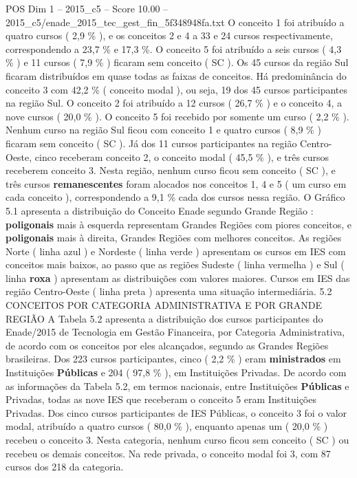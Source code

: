 \begin{textsample}{POS Dim 1 – 2015\_c5 – Score 10.00 – 2015\_c5/enade\_2015\_tec\_gest\_fin\_5f348948fa.txt}
O conceito 1 foi atribuído a quatro cursos ( 2,9 \% ), e os conceitos 2 e 4 a 33 e 24 cursos respectivamente, correspondendo a 23,7 \% e 17,3 \%.
O conceito 5 foi atribuído a seis cursos ( 4,3 \% ) e 11 cursos ( 7,9 \% ) ficaram sem conceito ( SC ).
Os 45 cursos da região Sul ficaram distribuídos em quase todas as faixas de conceitos.
Há predominância do conceito 3 com 42,2 \% ( conceito modal ), ou seja, 19 dos 45 cursos participantes na região Sul.
O conceito 2 foi atribuído a 12 cursos ( 26,7 \% ) e o conceito 4, a nove cursos ( 20,0 \% ).
O conceito 5 foi recebido por somente um curso ( 2,2 \% ).
Nenhum curso na região Sul ficou com conceito 1 e quatro cursos ( 8,9 \% ) ficaram sem conceito ( SC ).
Já dos 11 cursos participantes na região Centro-Oeste, cinco receberam conceito 2, o conceito modal ( 45,5 \% ), e três cursos receberem conceito 3.
Nesta região, nenhum curso ficou sem conceito ( SC ), e três cursos \textbf{remanescentes} foram alocados nos conceitos 1, 4 e 5 ( um curso em cada conceito ), correspondendo a 9,1 \% cada dos cursos nessa região.
O Gráfico 5.1 apresenta a distribuição do Conceito Enade segundo Grande Região : \textbf{poligonais} mais à esquerda representam Grandes Regiões com piores conceitos, e \textbf{poligonais} mais à direita, Grandes Regiões com melhores conceitos.
As regiões Norte ( linha azul ) e Nordeste ( linha verde ) apresentam os cursos em IES com conceitos mais baixos, ao passo que as regiões Sudeste ( linha vermelha ) e Sul ( linha \textbf{roxa} ) apresentam as distribuições com valores maiores.
Cursos em IES das região Centro-Oeste ( linha preta ) apresenta uma situação intermediária. 5.2 CONCEITOS POR CATEGORIA ADMINISTRATIVA E POR GRANDE REGIÃO A Tabela 5.2 apresenta a distribuição dos cursos participantes do Enade/2015 de Tecnologia em Gestão Financeira, por Categoria Administrativa, de acordo com os conceitos por eles alcançados, segundo as Grandes Regiões brasileiras.
Dos 223 cursos participantes, cinco ( 2,2 \% ) eram \textbf{ministrados} em Instituições \textbf{Públicas} e 204 ( 97,8 \% ), em Instituições Privadas.
De acordo com as informações da Tabela 5.2, em termos nacionais, entre Instituições \textbf{Públicas} e Privadas, todas as nove IES que receberam o conceito 5 eram Instituições Privadas.
Dos cinco cursos participantes de IES Públicas, o conceito 3 foi o valor modal, atribuído a quatro cursos ( 80,0 \% ), enquanto apenas um ( 20,0 \% ) recebeu o conceito 3.
Nesta categoria, nenhum curso ficou sem conceito ( SC ) ou recebeu os demais conceitos.
Na rede privada, o conceito modal foi 3, com 87 cursos dos 218 da categoria.

\end{textsample}
